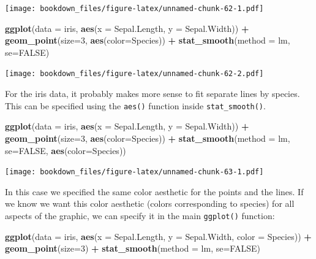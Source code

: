\documentclass[
]{krantz}
\makeatletter
\newenvironment{Shaded}{\begin{snugshade}}{\end{snugshade}}
\newcommand{\DataTypeTok}[1]{\textcolor[rgb]{0.27,0.27,0.27}{#1}}
\newcommand{\DecValTok}[1]{\textcolor[rgb]{0.06,0.06,0.06}{#1}}
\newcommand{\KeywordTok}[1]{\textcolor[rgb]{0.27,0.27,0.27}{\textbf{#1}}}
\newcommand{\NormalTok}[1]{#1}
\newcommand{\OperatorTok}[1]{\textcolor[rgb]{0.43,0.43,0.43}{\textbf{#1}}}
\newcommand{\OtherTok}[1]{\textcolor[rgb]{0.37,0.37,0.37}{#1}}
\newcommand{\StringTok}[1]{\textcolor[rgb]{0.5,0.5,0.5}{#1}}
\newenvironment{kframe}{%
\medskip{}
\setlength{\fboxsep}{.8em}
 \def\at@end@of@kframe{}%
 \ifinner\ifhmode%
  \def\at@end@of@kframe{\end{minipage}}%
  \begin{minipage}{\columnwidth}%
 \fi\fi%
 \def\FrameCommand##1{\hskip\@totalleftmargin \hskip-\fboxsep
 \colorbox{shadecolor}{##1}\hskip-\fboxsep
     \hskip-\linewidth \hskip-\@totalleftmargin \hskip\columnwidth}%
 \MakeFramed {\advance\hsize-\width
   \@totalleftmargin\z@ \linewidth\hsize
   \@setminipage}}%
 {\par\unskip\endMakeFramed%
 \at@end@of@kframe}
\renewenvironment{Shaded}{\begin{kframe}}{\end{kframe}}
\makeatother
\begin{document}
\texttt{[image: bookdown\_files/figure-latex/unnamed-chunk-62-1.pdf]}

\begin{Shaded}
\begin{Highlighting}[]
\KeywordTok{ggplot}\NormalTok{(}\DataTypeTok{data =}\NormalTok{ iris, }\KeywordTok{aes}\NormalTok{(}\DataTypeTok{x =}\NormalTok{ Sepal.Length, }\DataTypeTok{y =}\NormalTok{ Sepal.Width)) }\OperatorTok{+}\StringTok{ }
\StringTok{    }\KeywordTok{geom\_point}\NormalTok{(}\DataTypeTok{size=}\DecValTok{3}\NormalTok{, }\KeywordTok{aes}\NormalTok{(}\DataTypeTok{color=}\NormalTok{Species)) }\OperatorTok{+}\StringTok{ }
\StringTok{    }\KeywordTok{stat\_smooth}\NormalTok{(}\DataTypeTok{method =}\NormalTok{ lm, }\DataTypeTok{se=}\OtherTok{FALSE}\NormalTok{)}
\end{Highlighting}
\end{Shaded}

\texttt{[image: bookdown\_files/figure-latex/unnamed-chunk-62-2.pdf]}

For the iris data, it probably makes more sense to fit separate lines by species. This can be specified using the \texttt{aes()} function inside \texttt{stat\_smooth()}.

\begin{Shaded}
\begin{Highlighting}[]
\KeywordTok{ggplot}\NormalTok{(}\DataTypeTok{data =}\NormalTok{ iris, }\KeywordTok{aes}\NormalTok{(}\DataTypeTok{x =}\NormalTok{ Sepal.Length, }\DataTypeTok{y =}\NormalTok{ Sepal.Width)) }\OperatorTok{+}\StringTok{ }
\StringTok{    }\KeywordTok{geom\_point}\NormalTok{(}\DataTypeTok{size=}\DecValTok{3}\NormalTok{, }\KeywordTok{aes}\NormalTok{(}\DataTypeTok{color=}\NormalTok{Species)) }\OperatorTok{+}\StringTok{ }
\StringTok{    }\KeywordTok{stat\_smooth}\NormalTok{(}\DataTypeTok{method =}\NormalTok{ lm, }\DataTypeTok{se=}\OtherTok{FALSE}\NormalTok{, }\KeywordTok{aes}\NormalTok{(}\DataTypeTok{color=}\NormalTok{Species))}
\end{Highlighting}
\end{Shaded}

\texttt{[image: bookdown\_files/figure-latex/unnamed-chunk-63-1.pdf]}

In this case we specified the same color aesthetic for the points and the lines. If we know we want this color aesthetic (colors corresponding to species) for all aspects of the graphic, we can specify it in the main \texttt{ggplot()} function:

\begin{Shaded}
\begin{Highlighting}[]
\KeywordTok{ggplot}\NormalTok{(}\DataTypeTok{data =}\NormalTok{ iris, }\KeywordTok{aes}\NormalTok{(}\DataTypeTok{x =}\NormalTok{ Sepal.Length, }\DataTypeTok{y =}\NormalTok{ Sepal.Width, }\DataTypeTok{color =}\NormalTok{ Species)) }\OperatorTok{+}\StringTok{ }
\StringTok{    }\KeywordTok{geom\_point}\NormalTok{(}\DataTypeTok{size=}\DecValTok{3}\NormalTok{) }\OperatorTok{+}\StringTok{ }\KeywordTok{stat\_smooth}\NormalTok{(}\DataTypeTok{method =}\NormalTok{ lm, }\DataTypeTok{se=}\OtherTok{FALSE}\NormalTok{)}
\end{Highlighting}
\end{Shaded}
\end{document}
